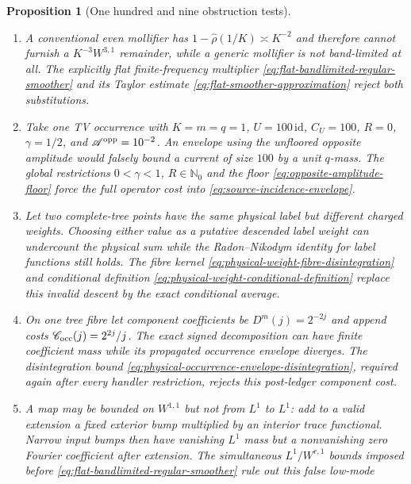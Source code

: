 \documentclass[11pt]{article}
\newtheorem{proposition}[theorem]{Proposition}
\begin{document}
\begin{proposition}[One hundred and nine obstruction tests]
\begin{enumerate}[label=\textup{(T\arabic*)}]
      the signed recombination identity
      \eqref{eq:physical-occurrence-signed-recombination} fix its scale
      before the Markov occurrence kernel is applied.
\item A conventional even mollifier has
      $1-\widehat\rho(1/K)\asymp K^{-2}$ and therefore cannot furnish a
      $K^{-3}W^{3,1}$ remainder, while a generic mollifier is not
      band-limited at all.  The explicitly flat finite-frequency multiplier
      \eqref{eq:flat-bandlimited-regular-smoother} and its Taylor estimate
      \eqref{eq:flat-smoother-approximation} reject both substitutions.
\item Take one TV occurrence with $K=m=q=1$, $U=100\,\mathrm{id}$,
      $C_U=100$, $R=0$, $\gamma=1/2$, and
      $\mathscr A^{\rm opp}=10^{-2}$.  An envelope using the unfloored
      opposite amplitude would falsely bound a current of size $100$ by a
      unit $q$-mass.  The global restrictions $0<\gamma<1$, $R\in\mathbb N_0$
      and the floor \eqref{eq:opposite-amplitude-floor} force the full
      operator cost into \eqref{eq:source-incidence-envelope}.
\item Let two complete-tree points have the same physical label but different
      charged weights.  Choosing either value as a putative descended label
      weight can undercount the physical sum while the Radon--Nikodym identity
      for label functions still holds.  The fibre kernel
      \eqref{eq:physical-weight-fibre-disintegration} and conditional
      definition \eqref{eq:physical-weight-conditional-definition} replace
      this invalid descent by the exact conditional average.
\item On one tree fibre let component coefficients be
      $D^m(j)=2^{-2j}$ and append costs
      $\mathscr C_{\rm occ}(j)=2^{2j}/j$.  The exact signed decomposition can
      have finite coefficient mass while its propagated occurrence envelope
      diverges.  The disintegration bound
      \eqref{eq:physical-occurrence-envelope-disintegration}, required again
      after every handler restriction, rejects this post-ledger component
      cost.
\item A map may be bounded on $W^{1,1}$ but not from $L^1$ to $L^1$: add to a
      valid extension a fixed exterior bump multiplied by an interior trace
      functional.  Narrow input bumps then have vanishing $L^1$ mass but a
      nonvanishing zero Fourier coefficient after extension.  The simultaneous
      $L^1/W^{r,1}$ bounds imposed before
      \eqref{eq:flat-bandlimited-regular-smoother} rule out this false low-mode

\end{enumerate}
\end{proposition}
\end{document}
